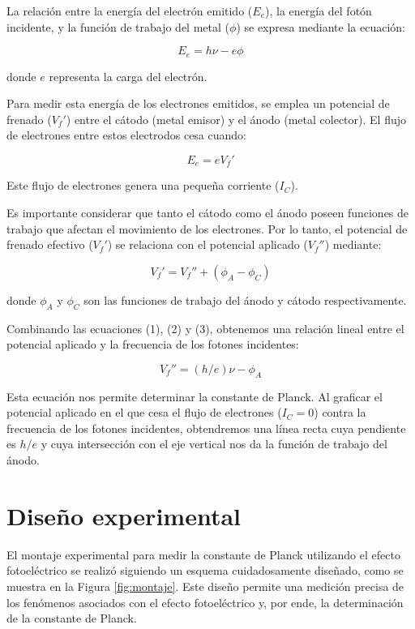 \documentclass[twocolumn,a4paper,11pt]{scrartcl}
\begin{document}
La relación entre la energía del electrón emitido ($E_e$), la energía del fotón incidente, y la función de trabajo del metal ($\phi$) se expresa mediante la ecuación:

\begin{equation}
E_e = h\nu - e\phi
\end{equation}

donde $e$ representa la carga del electrón.

Para medir esta energía de los electrones emitidos, se emplea un potencial de frenado ($V_f'$) entre el cátodo (metal emisor) y el ánodo (metal colector). El flujo de electrones entre estos electrodos cesa cuando:

\begin{equation}
E_e = eV_f'
\end{equation}

Este flujo de electrones genera una pequeña corriente ($I_C$).

Es importante considerar que tanto el cátodo como el ánodo poseen funciones de trabajo que afectan el movimiento de los electrones. Por lo tanto, el potencial de frenado efectivo ($V_f'$) se relaciona con el potencial aplicado ($V_f''$) mediante:

\begin{equation}
V_f' = V_f'' + (\phi_A - \phi_C)
\end{equation}

donde $\phi_A$ y $\phi_C$ son las funciones de trabajo del ánodo y cátodo respectivamente.

Combinando las ecuaciones (1), (2) y (3), obtenemos una relación lineal entre el potencial aplicado y la frecuencia de los fotones incidentes:

\begin{equation}
V_f'' = (h/e)\nu - \phi_A
\end{equation}

Esta ecuación nos permite determinar la constante de Planck. Al graficar el potencial aplicado en el que cesa el flujo de electrones ($I_C = 0$) contra la frecuencia de los fotones incidentes, obtendremos una línea recta cuya pendiente es $h/e$ y cuya intersección con el eje vertical nos da la función de trabajo del ánodo.

\section{Diseño experimental}

El montaje experimental para medir la constante de Planck utilizando el efecto fotoeléctrico se realizó siguiendo un esquema cuidadosamente diseñado, como se muestra en la Figura \ref{fig:montaje}. Este diseño permite una medición precisa de los fenómenos asociados con el efecto fotoeléctrico y, por ende, la determinación de la constante de Planck.
\end{document}
